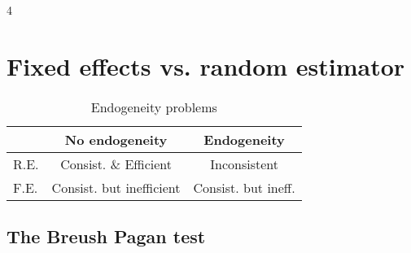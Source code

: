 4
\section{Fixed effects vs. random estimator} %
\begin{table}[h]
  \centering
  \footnotesize
  \begin{tabular}{l|cc}
    {}    & No endogeneity            & Endogeneity   \\
    \midrule
    R.E.  & Consist. \& Efficient     & Inconsistent  \\
    F.E.  & Consist. but inefficient  & Consist. but ineff.
  \end{tabular}
\caption{Endogeneity problems}
\label{tab:endogeneity}
\end{table}

\begin{multicols}{2}



\subsection{The Breush Pagan test}



\end{multicols}
